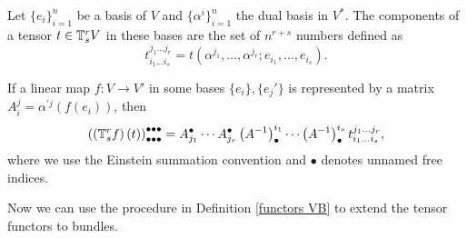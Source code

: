 \begin{defn}
    Let $\{e_i\}_{i=1}^n$ be a basis of $V$ and $\{\alpha^i\}_{i=1}^n$ the dual basis in $V^\ast$. The components of a tensor $t\in \mathbb{T}^r_s V$ in these bases are the set of $n^{r+s}$ numbers defined as
    \[
    t_{i_1\ldots i_s}^{j_1\ldots j_r}=t\left(\alpha^{j_1},\ldots,\alpha^{j_r};e_{i_1},\ldots,e_{i_s}\right).
    \]
\end{defn}

If a linear map $f:V\to V'$ in some bases $\{e_i\},\{e_j'\}$ is represented by a matrix $A_i^j=\alpha^{\prime j} (f(e_i))$, then 
\[
\left(\left(\mathbb{T}^r_s f\right)(t)\right)^{\bullet\bullet\bullet}_{\bullet\bullet\bullet}=A^\bullet_{j_1}\cdots A_{j_r}^\bullet \left(A^{-1}\right)^{i_1}_\bullet \cdots \left(A^{-1}\right)^{i_s}_\bullet t_{i_1\ldots i_s}^{j_1\ldots j_r},
\]
where we use the Einstein summation convention and $\bullet$ denotes unnamed free indices.

Now we can use the procedure in Definition \ref{functors VB} to extend the tensor functors to bundles.

